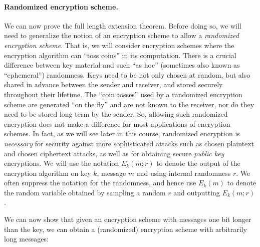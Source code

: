\paragraph{Randomized encryption scheme.} We can now prove the full
length extension theorem. Before doing so, we will need to generalize
the notion of an encryption scheme to allow a \emph{randomized
encryption scheme}. That is, we will consider encryption schemes where
the encryption algorithm can ``toss coins'' in its computation. There is
a crucial difference between key material and such ``as hoc'' (sometimes
also known as ``ephemeral'') randomness. Keys need to be not only chosen
at random, but also shared in advance between the sender and receiver,
and stored securely throughout their lifetime. The ``coin tosses'' used
by a randomized encryption scheme are generated ``on the fly'' and are
not known to the receiver, nor do they need to be stored long term by
the sender. So, allowing such randomized encryption does not make a
difference for most applications of encryption schemes. In fact, as we
will see later in this course, randomized encryption is \emph{necessary}
for security against more sophisticated attacks such as chosen plaintext
and chosen ciphertext attacks, as well as for obtaining secure
\emph{public key} encryptions. We will use the notation \(E_k(m;r)\) to
denote the output of the encryption algorithm on key \(k\), message
\(m\) and using internal randomness \(r\). We often suppress the
notation for the randomness, and hence use \(E_k(m)\) to denote the
random variable obtained by sampling a random \(r\) and outputting
\(E_k(m;r)\).

We can now show that given an encryption scheme with messages one bit
longer than the key, we can obtain a (randomized) encryption scheme with
arbitrarily long messages:

\hypertarget{lengthextendthm}{}

